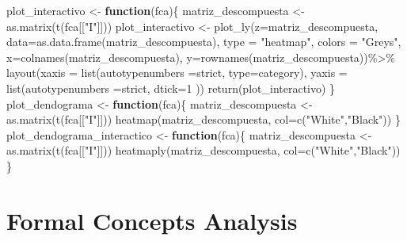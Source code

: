 \documentclass[
]{book}
\newenvironment{Shaded}{\begin{snugshade}}{\end{snugshade}}
\newcommand{\AttributeTok}[1]{\textcolor[rgb]{0.77,0.63,0.00}{#1}}
\newcommand{\ControlFlowTok}[1]{\textcolor[rgb]{0.13,0.29,0.53}{\textbf{#1}}}
\newcommand{\DecValTok}[1]{\textcolor[rgb]{0.00,0.00,0.81}{#1}}
\newcommand{\FunctionTok}[1]{\textcolor[rgb]{0.00,0.00,0.00}{#1}}
\newcommand{\NormalTok}[1]{#1}
\newcommand{\OtherTok}[1]{\textcolor[rgb]{0.56,0.35,0.01}{#1}}
\newcommand{\SpecialCharTok}[1]{\textcolor[rgb]{0.00,0.00,0.00}{#1}}
\newcommand{\StringTok}[1]{\textcolor[rgb]{0.31,0.60,0.02}{#1}}
\begin{document}
\begin{Shaded}
\begin{Highlighting}[]
\NormalTok{plot\_interactivo }\OtherTok{\textless{}{-}} \ControlFlowTok{function}\NormalTok{(fca)\{}
\NormalTok{  matriz\_descompuesta }\OtherTok{\textless{}{-}} \FunctionTok{as.matrix}\NormalTok{(}\FunctionTok{t}\NormalTok{(fca[[}\StringTok{"I"}\NormalTok{]]))}
\NormalTok{  plot\_interactivo }\OtherTok{\textless{}{-}} \FunctionTok{plot\_ly}\NormalTok{(}\AttributeTok{z=}\NormalTok{matriz\_descompuesta, }\AttributeTok{data=}\FunctionTok{as.data.frame}\NormalTok{(matriz\_descompuesta), }\AttributeTok{type =} \StringTok{"heatmap"}\NormalTok{, }\AttributeTok{colors =} \StringTok{"Greys"}\NormalTok{, }\AttributeTok{x=}\FunctionTok{colnames}\NormalTok{(matriz\_descompuesta), }\AttributeTok{y=}\FunctionTok{rownames}\NormalTok{(matriz\_descompuesta))}\SpecialCharTok{\%\textgreater{}\%} \FunctionTok{layout}\NormalTok{(}\AttributeTok{xaxis =} \FunctionTok{list}\NormalTok{(}\AttributeTok{autotypenumbers =}\StringTok{\textquotesingle{}strict\textquotesingle{}}\NormalTok{, }\AttributeTok{type=}\StringTok{\textquotesingle{}category\textquotesingle{}}\NormalTok{), }\AttributeTok{yaxis =} \FunctionTok{list}\NormalTok{(}\AttributeTok{autotypenumbers =}\StringTok{\textquotesingle{}strict\textquotesingle{}}\NormalTok{, }\AttributeTok{dtick=}\DecValTok{1}\NormalTok{ ))}
  \FunctionTok{return}\NormalTok{(plot\_interactivo)}
\NormalTok{\}}
\NormalTok{plot\_dendograma }\OtherTok{\textless{}{-}} \ControlFlowTok{function}\NormalTok{(fca)\{}
\NormalTok{  matriz\_descompuesta }\OtherTok{\textless{}{-}} \FunctionTok{as.matrix}\NormalTok{(}\FunctionTok{t}\NormalTok{(fca[[}\StringTok{"I"}\NormalTok{]]))}
  \FunctionTok{heatmap}\NormalTok{(matriz\_descompuesta, }\AttributeTok{col=}\FunctionTok{c}\NormalTok{(}\StringTok{"White"}\NormalTok{,}\StringTok{"Black"}\NormalTok{))}
\NormalTok{\}}
\NormalTok{plot\_dendograma\_interactico }\OtherTok{\textless{}{-}} \ControlFlowTok{function}\NormalTok{(fca)\{}
\NormalTok{  matriz\_descompuesta }\OtherTok{\textless{}{-}} \FunctionTok{as.matrix}\NormalTok{(}\FunctionTok{t}\NormalTok{(fca[[}\StringTok{"I"}\NormalTok{]]))}
  \FunctionTok{heatmaply}\NormalTok{(matriz\_descompuesta, }\AttributeTok{col=}\FunctionTok{c}\NormalTok{(}\StringTok{"White"}\NormalTok{,}\StringTok{"Black"}\NormalTok{))}
\NormalTok{\}}
\end{Highlighting}
\end{Shaded}

\hypertarget{formal-concepts-analysis}{%
\section{Formal Concepts Analysis}\label{formal-concepts-analysis}}
\end{document}
